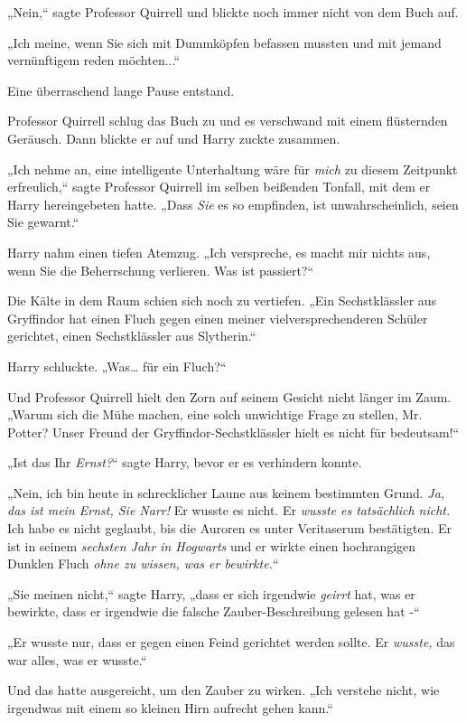 {„Nein,“ sagte Professor Quirrell und blickte noch immer nicht von dem Buch auf.

„Ich meine, wenn Sie sich mit Dummköpfen befassen mussten und mit jemand vernünftigem reden möchten...“

Eine überraschend lange Pause entstand.

Professor Quirrell schlug das Buch zu und es verschwand mit einem flüsternden Geräusch. Dann blickte er auf und Harry zuckte zusammen.

„Ich nehme an, eine intelligente Unterhaltung wäre für \emph{mich} zu diesem Zeitpunkt erfreulich,“ sagte Professor Quirrell im selben beißenden Tonfall, mit dem er Harry hereingebeten hatte. „Dass \emph{Sie} es so empfinden, ist unwahrscheinlich, seien Sie gewarnt.“

Harry nahm einen tiefen Atemzug. „Ich verspreche, es macht mir nichts aus, wenn Sie die Beherrschung verlieren. Was ist passiert?“

Die Kälte in dem Raum schien sich noch zu vertiefen. „Ein Sechstklässler aus Gryffindor hat einen Fluch gegen einen meiner vielversprechenderen Schüler gerichtet, einen Sechstklässler aus Slytherin.“

Harry schluckte. „Was… für ein Fluch?“

Und Professor Quirrell hielt den Zorn auf seinem Gesicht nicht länger im Zaum. „Warum sich die Mühe machen, eine solch unwichtige Frage zu stellen, Mr. Potter? Unser Freund der Gryffindor-Sechstklässler hielt es nicht für bedeutsam!“

„Ist das Ihr \emph{Ernst?}“ sagte Harry, bevor er es verhindern konnte.

„Nein, ich bin heute in schrecklicher Laune aus keinem bestimmten Grund. \emph{Ja, das ist mein Ernst, Sie Narr!} Er wusste es nicht. Er \emph{wusste es tatsächlich nicht.} Ich habe es nicht geglaubt, bis die Auroren es unter Veritaserum bestätigten. Er ist in seinem \emph{sechsten Jahr in Hogwarts} und er wirkte einen hochrangigen Dunklen Fluch \emph{ohne zu wissen, was er bewirkte.}“

„Sie meinen nicht,“ sagte Harry, „dass er sich irgendwie \emph{geirrt} hat, was er bewirkte, dass er irgendwie die falsche Zauber-Beschreibung gelesen hat -“

„Er wusste nur, dass er gegen einen Feind gerichtet werden sollte. Er \emph{wusste,} das war alles, was er wusste.“

Und das hatte ausgereicht, um den Zauber zu wirken. „Ich verstehe nicht, wie irgendwas mit einem so kleinen Hirn aufrecht gehen kann.“

}
